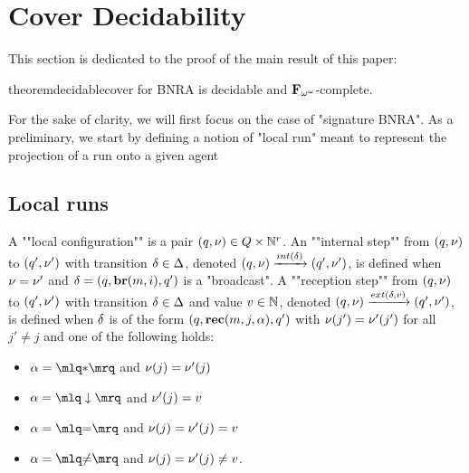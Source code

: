 \section{Cover Decidability}
\label{sec:cover-decidability}

This section is dedicated to the proof of the main result of this paper:

\begin{restatable}{theorem}{decidablecover}
\label{thm:decidable-cover}
\COVER for BNRA is decidable and $\mathbf{F}_{\omega^\omega}$-complete.
\end{restatable}

For the sake of clarity, we will first focus on the case of "signature BNRA". 
As a preliminary, we start by defining a notion of "local run" meant to represent the projection of a run onto a given agent

\subsection{Local runs}
\AP A ""local configuration"" is a pair $(q, \nu) \in Q \times \mathbb{N}^r$.  
\AP An ""internal step"" from $(q,\nu)$ to $(q',\nu')$ with transition $\delta \in \Delta$, denoted $(q,\localdata) \intstep{\atrans} (q',\localdata')$, is defined when $\nu = \nu'$ and $\delta =(q, \textbf{br}(m, i), q')$ is a "broadcast".  
\AP A ""reception step"" from $(q,\nu)$ to $(q',\nu')$ with transition $\delta \in \Delta$ and value $v \in \mathbb{N}$, denoted $(q,\localdata) \extbr{\atrans}{\aval} (q',\localdata')$, is defined when $\delta$ is of the form $(q,\textbf{rec}(m, j, \alpha),q')$ with $\nu(j') = \nu'(j')$ for all $j' \neq j$ and one of the following holds:
	
	\begin{minipage}[t]{6cm}
		\begin{itemize}
			\item $\anact = \quotemarks{\dummyact}$ 
			and $\nu(j) = \nu'(j)$
			\item $\anact = \quotemarks{\enregact}$ and $\nu'(j) = v$
		\end{itemize}
	\end{minipage}
	\begin{minipage}[t]{6cm}
		\begin{itemize}
			\item $\anact = \quotemarks{\eqtestact}$ and $\nu(j) = \nu'(j)= v$
			\item $\anact = \quotemarks{\diseqtestact}$ and $\nu(j) = \nu'(j) \ne v$.
		\end{itemize}
	\end{minipage}
	

